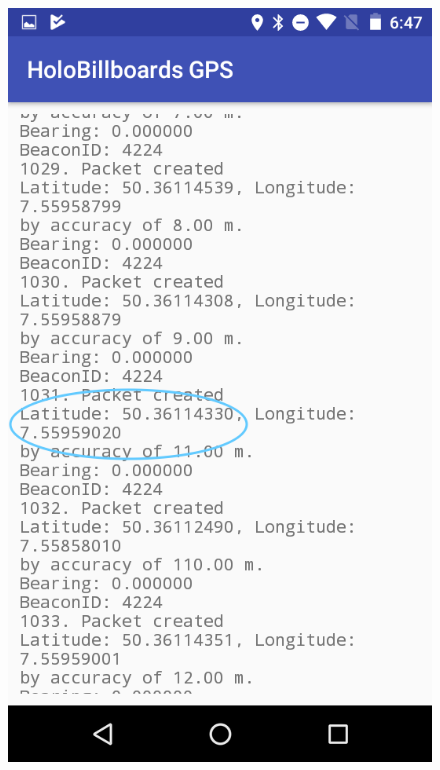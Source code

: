 \documentclass{beamer}
\begin{document}
\begin{frame}
\begin{figure}
\begin{minipage}{0.24\linewidth}
            \includegraphics[width=\linewidth]{images/GPSLog}        
        \end{minipage}
    \end{figure}

\end{frame}
\end{document}
